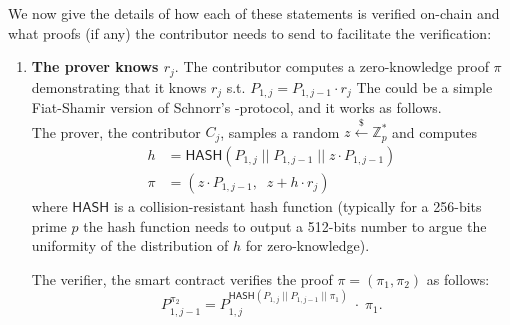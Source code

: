 \documentclass{article}
\newcommand{\sample}{\stackrel{\$}{\gets}}
\begin{document}
We now give the details of how each of these statements is verified on-chain and what proofs (if any) the contributor needs to send to facilitate the verification:

\begin{enumerate}
    \item \textbf{The prover knows $r_j$}. The contributor computes a zero-knowledge proof $\pi$ demonstrating that it knows $r_j$ s.t. $P_{1, j} = P_{1, j-1}\cdot {r_j}$
    The could be a simple Fiat-Shamir version of Schnorr's \textSigma{}-protocol, and it works as follows.\\
    
    The prover, the contributor $C_j$, samples a random $z \sample \mathbb{Z}^*_p$ and computes
    \begin{align*}
    h &= \textsf{HASH}(P_{1, j}\;||\;P_{1, j-1}\;||\; z \cdot P_{1, j-1})\\
    \pi &= (z \cdot P_{1, j-1},\;\; z + h \cdot r_j)
    \end{align*}
    where $\textsf{HASH}$ is a collision-resistant hash function (typically for a 256-bits prime $p$ the hash function needs to output a 512-bits number to argue the uniformity of the distribution of $h$ for zero-knowledge).

    The verifier, the smart contract verifies the proof $\pi = (\pi_1, \pi_2)$ as follows:
    \begin{equation}
        P_{1, j-1}^{\pi_2} = P_{1, j}^{\textsf{HASH}(P_{1, j}\;||\;P_{1, j-1}\;||\;\pi_1)}\; \cdot\; \pi_1.\label{eq:proof}
    \end{equation}
    

\end{enumerate}
\end{document}
